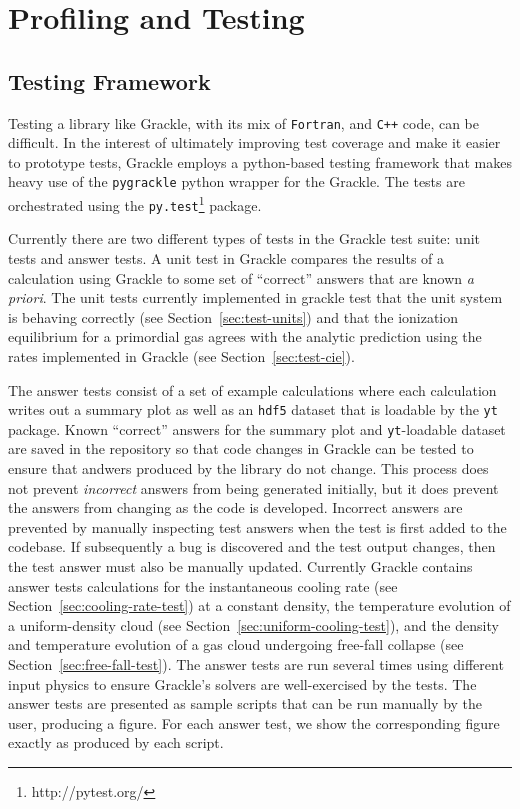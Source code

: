 \section{Profiling and Testing}
\label{sec:profiling-and-testing}



\subsection{Testing Framework}
\label{sec:testing}

Testing a library like Grackle, with its mix of \texttt{Fortran}, and
\texttt{C++} code, can be difficult. In the interest of ultimately improving
test coverage and make it easier to prototype tests, Grackle employs a
python-based testing framework that makes heavy use of the \texttt{pygrackle}
python wrapper for the Grackle. The tests are orchestrated using the
\texttt{py.test}\footnote{http://pytest.org/} package.

Currently there are two different types of tests in the Grackle test suite: unit
tests and answer tests. A unit test in Grackle compares the results of a
calculation using Grackle to some set of ``correct'' answers that are known
\textit{a priori}. The unit tests currently implemented in grackle test that the
unit system is behaving correctly (see Section~\ref{sec:test-units}) and that the
ionization equilibrium for a primordial gas agrees with the analytic prediction
using the rates implemented in Grackle (see Section~\ref{sec:test-cie}).

The answer tests consist of a set of example calculations where each calculation
writes out a summary plot as well as an \texttt{hdf5} dataset that is loadable
by the \texttt{yt} package. Known ``correct'' answers for the summary plot and
\texttt{yt}-loadable dataset are saved in the repository so that code changes in
Grackle can be tested to ensure that andwers produced by the library do not
change. This process does not prevent \textit{incorrect} answers from being
generated initially, but it does prevent the answers from changing as the code
is developed. Incorrect answers are prevented by manually inspecting test
answers when the test is first added to the codebase. If subsequently a bug is
discovered and the test output changes, then the test answer must also be
manually updated. Currently Grackle contains answer tests calculations for the
instantaneous cooling rate (see Section~\ref{sec:cooling-rate-test})
at a constant density, the temperature evolution of a uniform-density cloud (see
Section~\ref{sec:uniform-cooling-test}), and the density and
temperature evolution of a gas cloud undergoing free-fall collapse
(see Section~\ref{sec:free-fall-test}). The answer tests are run
several times using different input physics to ensure Grackle's
solvers are well-exercised by the tests.  The answer tests are
presented as sample scripts that can be run manually by the user,
producing a figure.  For each answer test, we show the corresponding
figure exactly as produced by each script.

